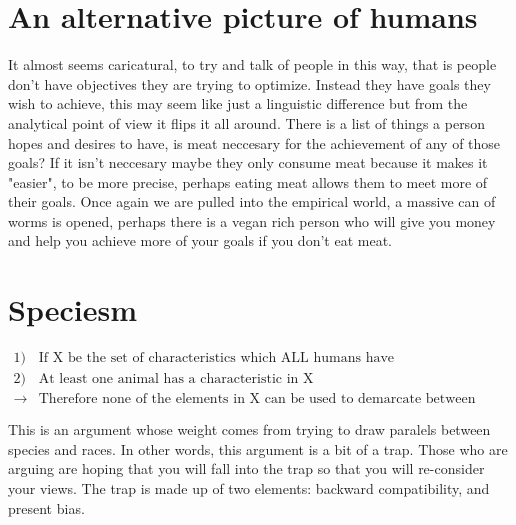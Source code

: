 \documentclass[12pt]{report}
\numberwithin{equation}{section}
\begin{document}
\section{An alternative picture of humans}

It almost seems caricatural, to try and talk of people in this way, that is people don't have objectives they are trying to optimize. Instead they have goals they wish to achieve, this may seem like just a linguistic difference but from the analytical point of view it flips it all around. There is a list of things a person hopes and desires to have, is meat neccesary for the achievement of any of those goals? If it isn't neccesary maybe they only consume meat because it makes it "easier", to be more precise, perhaps eating meat allows them to meet more of their goals. Once again we are pulled into the empirical world, a massive can of worms is opened, perhaps there is a vegan rich person who will give you money and help you achieve more of your goals if you don't eat meat. 



\section{Speciesm}

\begin{mdframed}[style=MyFrame]
\begin{align*}
1)& \text{If X be the set of characteristics which ALL humans have} \\
2)& \text{At least one animal has a characteristic in X} \\
\rightarrow& \text{Therefore none of the elements in X can be used to demarcate between animals and humans}
\end{align*}
\end{mdframed}

This is an argument whose weight comes from trying to draw paralels between species and races. In other words, this argument is a bit of a trap. Those who are arguing are hoping that you will fall into the trap so that you will re-consider your views. The trap is made up of two elements: backward compatibility, and present bias. 
\end{document}
